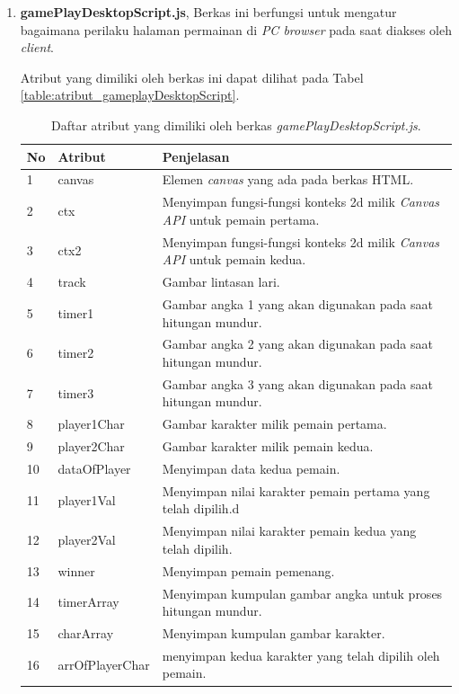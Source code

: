 \begin{enumerate}
\begin{enumerate}
\begin{enumerate}
			\item \textbf{gamePlayDesktopScript.js}, Berkas ini berfungsi untuk mengatur bagaimana perilaku halaman permainan di \textit{PC browser} pada saat diakses oleh \textit{client}.
			
			Atribut yang dimiliki oleh berkas ini dapat dilihat pada Tabel \ref{table:atribut_gameplayDesktopScript}.
			
			\begin{table}[H]
				\centering
				\caption{Daftar atribut yang dimiliki oleh berkas \textit{gamePlayDesktopScript.js}.}
				\begin{tabular}{|p{0.35cm}|p{3cm}|p{7cm}|}
					\hline
					No & Atribut & Penjelasan \\ \hline
					1 & canvas & Elemen \textit{canvas} yang ada pada berkas HTML. \\ \hline
					2 & ctx & Menyimpan fungsi-fungsi konteks 2d milik \textit{Canvas API} untuk pemain pertama. \\ \hline
					3 & ctx2 & Menyimpan fungsi-fungsi konteks 2d milik \textit{Canvas API} untuk pemain kedua. \\ \hline
					4 & track & Gambar lintasan lari. \\ \hline
					5 & timer1 & Gambar angka 1 yang akan digunakan pada saat hitungan mundur. \\ \hline
					6 & timer2 & Gambar angka 2 yang akan digunakan pada saat hitungan mundur. \\ \hline
					7 & timer3 & Gambar angka 3 yang akan digunakan pada saat hitungan mundur. \\ \hline
					8 & player1Char & Gambar karakter milik pemain pertama. \\ \hline
					9 & player2Char & Gambar karakter milik pemain kedua. \\ \hline
					10 & dataOfPlayer & Menyimpan data kedua pemain. \\ \hline
					11 & player1Val & Menyimpan nilai karakter pemain pertama yang telah dipilih.d \\ \hline
					12 & player2Val & Menyimpan nilai karakter pemain kedua yang telah dipilih. \\ \hline
					13 & winner & Menyimpan pemain pemenang. \\ \hline
					14 & timerArray & Menyimpan kumpulan gambar angka untuk proses hitungan mundur. \\ \hline
					15 & charArray & Menyimpan kumpulan gambar karakter. \\ \hline
					16 & arrOfPlayerChar & menyimpan kedua karakter yang telah dipilih oleh pemain. \\ \hline

\end{tabular}
\end{table}
\end{enumerate}
\end{enumerate}
\end{enumerate}
